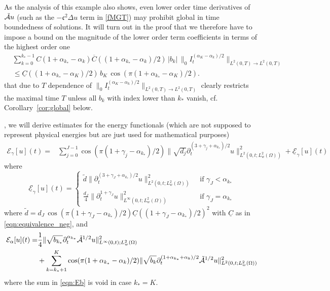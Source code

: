 {%
As the analysis of this example also shows, even lower order time derivatives of $\tilde{\mathcal{A}} u$ (such as the $-\mathfrak{c}^2\Delta u$ term in \eqref{fMGT}) may prohibit global in time boundedness of solutions. 
It will turn out in the proof that we therefore have to impose a bound on the magnitude of the lower order term coefficients in terms of the highest order one
\begin{equation}\label{smallnessbk}
\begin{aligned}
&\sum_{k=0}^{k_*-1} C(1+\alpha_{k_*}-\alpha_k)\overline{C}((1+\alpha_{k_*}-\alpha_k)/2)\, |b_k|\, \|_0I_t^{(\alpha_K-\alpha_k)/2}\|_{L^2(0,T)\to L^2(0,T)}\\
&\leq
\underline{C}((1+\alpha_{k_*}-\alpha_K)/2)\, b_K\, \cos ( \pi(1+\alpha_{k_*}-\alpha_K)/2 ).
\end{aligned}
\end{equation}
that due to $T$ dependence of $\|_0I_t^{(\alpha_K-\alpha_k)/2}\|_{L^2(0,T)\to L^2(0,T)}$ clearly restricts the maximal time $T$ unless all $b_k$ with index lower than $k_*$ vanish, cf. Corollary~\ref{cor:global} below.
}

, we will derive estimates for the energy functionals (which are not supposed to represent physical energies but are just used for mathematical purposes)
\begin{equation}\label{eqn:Ea}
\begin{aligned}
\mathcal{E}_\gamma[u](t)=&
\sum_{j=0}^{J-1} \cos ( \pi(1+\gamma_j-\alpha_{k_*})/2 ) \| \sqrt{d_j}\partial_t^{(3+\gamma_j+\alpha_{k_*})/2} u \|_{L^2(0,t;L^2_w(\Omega))}^2 + \underline{\mathcal{E}}_\gamma[u](t)
\end{aligned}
\end{equation}
where 
\begin{equation}\label{eqn:ulEa}
\underline{\mathcal{E}}_\gamma[u](t)=
\begin{cases}\tilde{d} \|\partial_t^{(3+\gamma_J+\alpha_{k_*})/2} u \|_{L^2(0,t;L^2_w(\Omega))}^2
&\mbox{ if }\gamma_J<\alpha_{k_*}\\
\frac{d_J}{4}\|\partial_t^{1+\gamma_J} u \|_{L^\infty(0,t;L^2_w(\Omega))}^2 &\mbox{ if }\gamma_J=\alpha_{k_*}
\end{cases}
\end{equation}
where 
$\tilde{d}=d_J\,\cos ( \pi(1+\gamma_J-\alpha_{k_*})/2 )  \underline{C}((1+\gamma_J-\alpha_{k_*})/2)^2$ with $\underline{C}$ as in \eqref{eqn:equivalence_neg}, 
\rerevision{$\theta=(1+\gamma_J-\alpha_{k_*})/2\in[0,1)$}
and 
\begin{equation}\label{eqn:Eb}
\begin{aligned}
\mathcal{E}_\alpha[u](t)=&
\frac14\|\sqrt{b_{k_*}}\partial_t^{\alpha_{k_*}}\tilde{\mathcal{A}}^{1/2}u\|_{L^\infty(0,t);L^2_w(\Omega)}^2\\
&+\sum_{k=k_*+1}^K
\cos ( \pi(1+\alpha_{k_*}-\alpha_k)/2 ) \| \sqrt{b_k}\partial_t^{(1+\alpha_{k_*}+\alpha_k)/2} \tilde{\mathcal{A}}^{1/2}u \|_{L^2(0,t;L^2_w(\Omega))}^2
\end{aligned}
\end{equation}
where the sum in \eqref{eqn:Eb} is void in case $k_*=K$.

